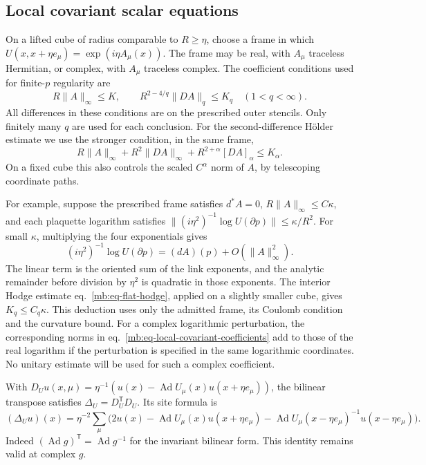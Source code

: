 \documentclass[11pt,letterpaper,reqno]{amsart}
\numberwithin{equation}{section}
\renewcommand{\eqref}[1]{\textup{eq.~\ref{#1}}}
\theoremstyle{definition}
\theoremstyle{remark}
\begin{document}
\subsection{Local covariant scalar equations}
\label{mb:sec-local-covariant}

On a lifted cube of radius comparable to \(R\ge\eta\), choose a
frame in which
\(U(x,x+\eta e_\mu)=\exp(i\eta A_\mu(x))\).
The frame may be real, with \(A_\mu\) traceless Hermitian, or complex,
with \(A_\mu\) traceless complex. The coefficient conditions
used for finite-\(p\) regularity are
\begin{equation}\label{mb:eq-local-covariant-coefficients}
 R\|A\|_\infty\le K,\qquad
 R^{2-4/q}\|DA\|_q\le K_q\quad(1<q<\infty).
\end{equation}
All differences in these conditions are on the prescribed outer
stencils. Only finitely many \(q\) are used for each conclusion.
For the second-difference Hölder estimate we use the stronger
condition, in the same frame,
\begin{equation}\label{mb:eq-local-covariant-strong-coefficients}
 R\|A\|_\infty+R^2\|DA\|_\infty
                    +R^{2+\alpha}[DA]_\alpha\le K_\alpha .
\end{equation}
On a fixed cube this also controls the scaled \(C^\alpha\)
norm of \(A\), by telescoping coordinate paths.

For example, suppose the prescribed frame satisfies \(d^*A=0\),
\(R\|A\|_\infty\le C\kappa\), and each plaquette logarithm satisfies
\(\|(i\eta^2)^{-1}\log U(\partial p)\|\le\kappa/R^2\).
For small \(\kappa\), multiplying the four exponentials gives
\[
 (i\eta^2)^{-1}\log U(\partial p)=(dA)(p)+O(\|A\|_\infty^2).
\]
The linear term is the oriented sum of the link exponents,
and the analytic remainder before division by \(\eta^2\)
is quadratic in those exponents. The interior Hodge estimate
\eqref{mb:eq-flat-hodge}, applied on a slightly smaller cube,
gives \(K_q\le C_q\kappa\). This deduction uses only the
admitted frame, its Coulomb condition and the curvature bound.
For a complex logarithmic perturbation, the corresponding
norms in \eqref{mb:eq-local-covariant-coefficients} add to
those of the real logarithm if the perturbation is specified
in the same logarithmic coordinates. No unitary estimate
will be used for such a complex coefficient.

With \(D_Uu(x,\mu)=\eta^{-1}
(u(x)-\operatorname{Ad}U_\mu(x)u(x+\eta e_\mu))\),
the bilinear transpose satisfies
\(\Delta_U=D_U^{\mathsf T}D_U\). Its site formula is
\begin{equation}\label{mb:eq-covariant-site-laplacian}
 (\Delta_Uu)(x)=\eta^{-2}\sum_\mu
 \bigl(2u(x)-\operatorname{Ad}U_\mu(x)u(x+\eta e_\mu)
       -\operatorname{Ad}U_\mu(x-\eta e_\mu)^{-1}
                                    u(x-\eta e_\mu)\bigr).
\end{equation}
Indeed \((\operatorname{Ad}g)^{\mathsf T}=\operatorname{Ad}g^{-1}\)
for the invariant bilinear form. This identity remains valid
at complex \(g\).
\end{document}
